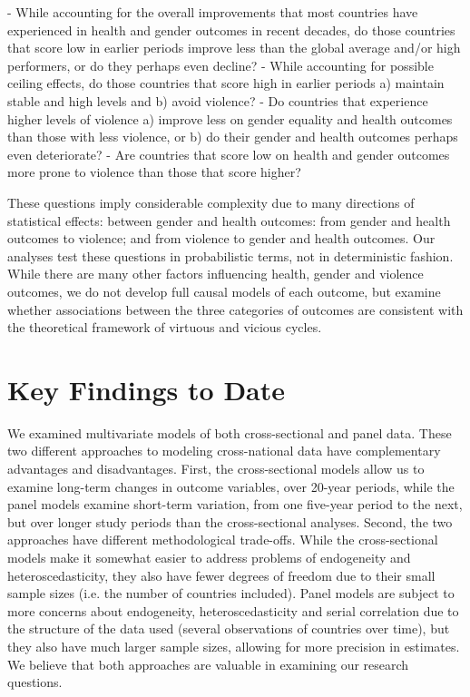 \documentclass[12pt]{article}
\begin{document}
- While accounting for the overall improvements that most countries have experienced in health and gender outcomes in recent decades, do those countries that score low in earlier periods improve less than the global average and/or high performers, or do they perhaps even decline?
- While accounting for possible ceiling effects, do those countries that score high in earlier periods a) maintain stable and high levels and b) avoid violence?
- Do countries that experience higher levels of violence a) improve less on gender equality and health outcomes than those with less violence, or b) do their gender and health outcomes perhaps even deteriorate?
- Are countries that score low on health and gender outcomes more prone to violence than those that score higher?

These questions imply considerable complexity due to many directions of statistical effects: between gender and health outcomes: from gender and health outcomes to violence; and from violence to gender and health outcomes. Our analyses test these questions in probabilistic terms, not in deterministic fashion. While there are many other factors influencing health, gender and violence outcomes, we do not develop full causal models of each outcome, but examine whether associations between the three categories of outcomes are consistent with the theoretical framework of virtuous and vicious cycles.

\section{Key Findings to Date}


We examined multivariate models of both cross-sectional and panel data. These two different approaches to modeling cross-national data have complementary advantages and disadvantages.
First, the cross-sectional models allow us to examine long-term changes in outcome variables, over 20-year periods, while the panel models examine short-term variation, from one five-year period to the next, but over longer study periods than the cross-sectional analyses.
Second, the two approaches have different methodological trade-offs. While the cross-sectional models make it somewhat easier to address problems of endogeneity and heteroscedasticity, they also have fewer degrees of freedom due to their small sample sizes (i.e. the number of countries included). Panel models are subject to more concerns about endogeneity, heteroscedasticity and serial correlation due to the structure of the data used (several observations of countries over time), but they also have much larger sample sizes, allowing for more precision in estimates. We believe that both approaches are valuable in examining our research questions.
\end{document}
